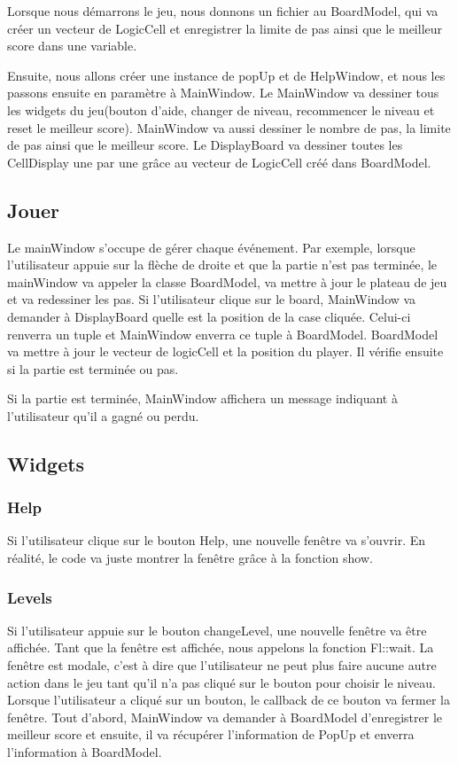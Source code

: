 \documentclass[utf8]{article}
\begin{document}
\begin{large}
Lorsque nous démarrons le jeu, nous donnons un fichier au BoardModel, qui va
créer un vecteur de LogicCell et enregistrer la limite de pas ainsi que le
meilleur score dans une variable.
\par
Ensuite, nous allons créer une instance de popUp et de HelpWindow, et nous les
passons ensuite en paramètre à MainWindow. Le MainWindow va dessiner tous les
widgets du jeu(bouton d'aide, changer de niveau, recommencer le niveau et reset
le meilleur score). MainWindow va aussi dessiner le nombre de pas, la limite de
pas ainsi que le meilleur score. Le DisplayBoard va dessiner toutes les
CellDisplay une par une grâce au vecteur de LogicCell créé dans BoardModel.


\par
\subsection{Jouer}
\indent
\par
Le mainWindow s'occupe de gérer chaque événement. Par exemple, lorsque
l'utilisateur appuie sur la flèche de droite et que la partie n'est pas
terminée, le mainWindow va appeler la classe BoardModel, va mettre à jour le
plateau de jeu et va redessiner les pas. Si l'utilisateur clique sur le board,
MainWindow va demander à DisplayBoard quelle est la position de la case cliquée.
Celui-ci renverra un tuple et MainWindow enverra ce tuple à BoardModel.
BoardModel va mettre à jour le vecteur de logicCell et la position du player. Il
vérifie ensuite si la partie est terminée ou pas.
\par
Si la partie est terminée, MainWindow affichera un message indiquant à
l'utilisateur qu'il a gagné ou perdu.
\par

\subsection{Widgets}
\subsubsection{Help}
\indent
\par
Si l'utilisateur clique sur le bouton Help, une nouvelle fenêtre va s'ouvrir. En
réalité, le code va juste montrer la fenêtre grâce à la fonction show.
\par
\subsubsection{Levels}
\indent
\par
Si l'utilisateur appuie sur le bouton changeLevel, une nouvelle fenêtre va être
affichée. Tant que la fenêtre est affichée, nous appelons la fonction Fl::wait.
La fenêtre est modale, c'est à dire que l'utilisateur ne peut plus faire aucune
autre action dans le jeu tant qu'il n'a pas cliqué sur le bouton pour choisir le
niveau. Lorsque l'utilisateur a cliqué sur un bouton, le callback de ce bouton
va fermer la fenêtre. Tout d'abord, MainWindow va demander à BoardModel
d'enregistrer le meilleur score et ensuite, il va récupérer l'information de
PopUp et enverra l'information à BoardModel.
\par


\end{large}
\end{document}
